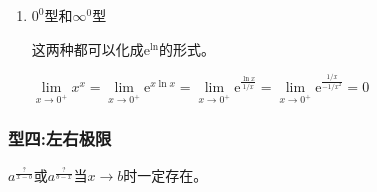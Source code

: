 \begin{enumerate}
            
    

                        
        \begin{example}
            求极限：$\lim\limits_{x \to +\infty}(2x+1)^2 \sin{\frac{1}{x^2}}$。
        \end{example}  
        
        \begin{solution}
            \begin{align*}
                \text{原式}
                &=\lim_{x \to +\infty}\frac{(2x+1)^2}{x^2} \times \frac{\sin{\frac{1}{x^2}}}{\frac{1}{x^2}}=4
            \end{align*}
        \end{solution}

        \begin{example}
            求极限：$\lim\limits_{x \to +\infty}(x-x^2\ln(1+\displaystyle\frac{1}{x}))$。
        \end{example}

        \begin{solution}
            \begin{align*}
                \text{原式}
                &=\lim_{x \to +\infty}x^2(\frac{1}{x}-\ln(1+\frac{1}{x}))\\
                &=\lim_{x \to +\infty}\frac{\frac{1}{x}-\ln(1+\frac{1}{x})}{\frac{1}{x^2}}\\
                &\xlongequal{t=\frac{1}{x}}\lim_{t \to 0}\frac{t-\ln(1+t)}{t^2}\\
                &=\lim_{t \to 0}\frac{1-\frac{1}{t+1}}{2t}\\
                &=\lim_{t \to 0}\frac{\frac{t}{t+1}}{2t}=\frac{1}{2}
            \end{align*}
        \end{solution}

        \item $0^0$型和$\infty ^{0}$型

        这两种都可以化成$\mathrm{e}^{\ln}$的形式。

        \begin{example}
            $\lim\limits_{x \to 0^{+}}x^x=\lim\limits_{x \to 0^{+}}\mathrm{e}^{x \ln x}=\lim\limits_{x \to 0^{+}}\mathrm{e}^{\frac{\ln x}{1/x}}=\lim\limits_{x \to 0^{+}}\mathrm{e}^{\frac{1/x}{-1/x^2}}=0$
        \end{example}
        \end{enumerate}

        \subsubsection*{型四:左右极限}
        \FiveStar $a^{\displaystyle\frac{?}{x-b}}$或$a^{\displaystyle\frac{?}{b-x}}$当$x \to b$时一定存在。

